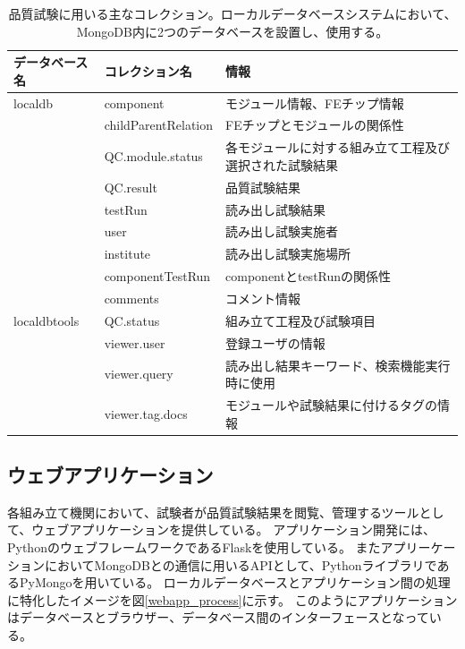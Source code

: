 \begin{table}[btp]
\begin{center}
\caption[品質試験に用いる主なコレクション]{品質試験に用いる主なコレクション。ローカルデータベースシステムにおいて、MongoDB内に2つのデータベースを設置し、使用する。}
\label{localdb_structure}
  \small
  \begin{tabular}{|lll|} \hline
    データベース名 & コレクション名 & 情報 \\ \hline
    localdb      & component & モジュール情報、FEチップ情報 \\ 
                 & childParentRelation & FEチップとモジュールの関係性 \\ 
                 & QC.module.status & 各モジュールに対する組み立て工程及び選択された試験結果 \\ 
                 & QC.result & 品質試験結果 \\ 
                 & testRun & 読み出し試験結果 \\ 
                 & user & 読み出し試験実施者 \\
                 & institute & 読み出し試験実施場所 \\
                 & componentTestRun & componentとtestRunの関係性 \\
                 & comments & コメント情報 \\ \hline
    localdbtools & QC.status & 組み立て工程及び試験項目\\
                 & viewer.user & 登録ユーザの情報 \\
                 & viewer.query & 読み出し結果キーワード、検索機能実行時に使用 \\ 
                 & viewer.tag.docs & モジュールや試験結果に付けるタグの情報 \\ \hline
  \end{tabular}
\end{center}
\end{table}

\clearpage
\subsection{ウェブアプリケーション} \label{sec:web_app}

各組み立て機関において、試験者が品質試験結果を閲覧、管理するツールとして、ウェブアプリケーションを提供している。
アプリケーション開発には、PythonのウェブフレームワークであるFlaskを使用している。
またアプリーケーションにおいてMongoDBとの通信に用いるAPIとして、PythonライブラリであるPyMongo\cite{4-4}を用いている。
ローカルデータベースとアプリケーション間の処理に特化したイメージを図\ref{webapp_process}に示す。
このようにアプリケーションはデータベースとブラウザー、データベース間のインターフェースとなっている。

